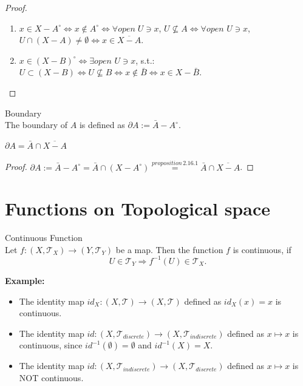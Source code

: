 \begin{proof}
    \begin{enumerate}
        \item $x \in X-A^\circ \Leftrightarrow x \notin A^\circ \Leftrightarrow \forall open\; U \ni x$, $U \nsubseteq A \Leftrightarrow \forall open$ $U \ni x$, $U \cap (X-A) \neq \emptyset \Leftrightarrow x \in \overline{X-A}$.
        \item $x\in (X-B)^\circ \Leftrightarrow \exists open$ $U \ni x$, s.t.: $U \subset (X-B) \Leftrightarrow U \nsubseteq B \Leftrightarrow x \notin \bar{B} \Leftrightarrow x \in X-\bar{B}$.
    \end{enumerate}
\end{proof}

\begin{definition}{Boundary}\\
The boundary of $A$ is defined as $\partial A:= \bar{A} - A^\circ$.
\end{definition}

\begin{proposition}
    $\partial A = \bar{A} \cap \overline{X-A}$
\end{proposition}

\begin{proof}
    $\partial A:= \bar{A} - A^\circ = \bar{A}  \cap (X-A^\circ) \overset{proposition \,2.16.1}{=} \bar{A} \cap \overline{X-A}$.
\end{proof}

\section{Functions on Topological space}

\begin{definition}{Continuous Function}\\
Let $f : (X ,\mathcal{T}_X) \rightarrow (Y,\mathcal{T}_Y)$ be a map. Then the function $f$ is continuous, if 
$$U \in \mathcal{T}_Y \Rightarrow f^{-1}(U) \in \mathcal{T}_X.$$
\end{definition}

\noindent\textbf{Example:}
\begin{itemize}
    \item The identity map $id_X:(X,\mathcal{T})\rightarrow (X,\mathcal{T})$ defined as $id_X(x) = x$ is continuous.
    \item The identity map $id:(X,\mathcal{T}_{discrete}) \rightarrow (X,\mathcal{T}_{indiscrete})$ defined as $x \mapsto x$ is continuous, since $id^{-1}(\emptyset)= \emptyset$ and $id^{-1}(X) = X$.
    \item The identity map $id: (X,\mathcal{T}_{indiscrete}) \rightarrow (X,\mathcal{T}_{discrete})$ defined as $x \mapsto x$ is NOT continuous.
\end{itemize}


